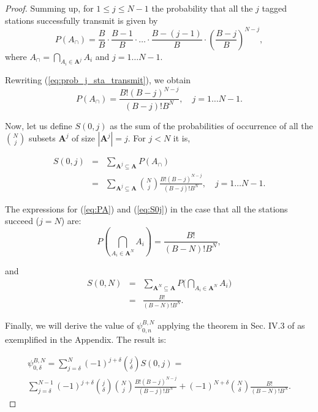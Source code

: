 \documentclass[journal]{IEEEtran}
\begin{document}
\begin{proof}
Summing up, for $1 \leq j \leq N-1$ the probability that all the $j$ tagged stations successfully transmit is given by
\begin{equation}
\label{eq:prob_j_sta_transmit}
P\left( A_\cap \right) = \frac{B}{B} \cdot \frac{B-1}{B} \cdot \dots \cdot \frac{B-(j-1)}{B} \cdot \left( \frac{B-j}{B} \right)^{N-j},
\end{equation}
where $A_\cap=\bigcap_{ A_i \in \mathbf{A}^j}A_i$ and $j=1\dots N-1$.

Rewriting (\ref{eq:prob_j_sta_transmit}), we obtain
\begin{equation}
\label{eq:PA}
P\left( A_\cap \right) = \frac{B! (B-j)^{N-j}}{(B-j)! B^N},
\quad j=1\dots N-1.
\end{equation}

Now, let us define $S(0,j)$ as the sum of the probabilities of occurrence of all the $\binom{N}{j}$ subsets $\mathbf{A}^j$ of size $|\mathbf{A}^j|=j$. For $j < N$ it is, 

\begin{eqnarray}
\label{eq:S0j}
S(0,j) & {}={}  & \sum_{\scriptstyle \mathbf{A}^j\subseteq\mathbf{A}} P\left( A_\cap \right) \\
&{}={}& \sum_{\scriptstyle \mathbf{A}^j\subseteq\mathbf{A}} \binom{N}{j}\frac{B! (B-j)^{N-j}}{(B-j)! B^N},
\quad j=1 \dots N-1. \nonumber
\end{eqnarray}

The expressions for (\ref{eq:PA}) and (\ref{eq:S0j}) in the case that all the stations succeed ($j=N$) are:
\begin{equation}
P\left( \bigcap_{ A_i \in \mathbf{A}^N } A_i \right) = \frac{B!}{(B-N)! B^N}
,
\end{equation}

and
\begin{eqnarray}
S(0,N) &{}={}& \sum_{\scriptstyle \mathbf{A}^N\subseteq\mathbf{A}} P\biggl(\bigcap_{A_i\in \mathbf{A}^N} A_i \biggr) \nonumber\\
&{}={}& \frac{B!}{(B-N)! B^N}.
\end{eqnarray}



Finally, we will derive the value of $\psi_{0,n}^{B,N}$ applying the theorem in Sec. IV.3 of \cite{feller1968ipt} as exemplified in the Appendix.
The result is:

\begin{equation}
\begin{split}
\psi^{B,N}_{0,\delta} = \sum_{j=\delta}^{N} (-1)^{j+\delta}\binom{j}{\delta} S(0,j)= \\
\sum_{j=\delta}^{N-1} (-1)^{j+\delta}\binom{j}{\delta} \binom{N}{j}\frac{B! (B-j)^{N-j}}{(B-j)! B^N}
+ (-1)^{N+\delta}\binom{N}{\delta}\frac{B!}{(B-N)! B^N}.
\end{split}
\label{eq:psi_zero}
\end{equation}


\end{proof}
\end{document}
